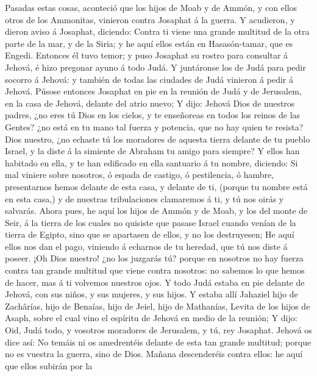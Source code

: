  Pasadas estas cosas, aconteció que los hijos de Moab y de
Ammón, y con ellos otros de los Ammonitas, vinieron contra Josaphat á la
guerra.  Y acudieron, y dieron aviso á Josaphat, diciendo:
Contra ti viene una grande multitud de la otra parte de la mar, y de la
Siria; y he aquí ellos están en Hasasón-tamar, que es Engedi.
 Entonces él tuvo temor; y puso Josaphat su rostro para
consultar á Jehová, é hizo pregonar ayuno á todo Judá.  Y
juntáronse los de Judá para pedir socorro á Jehová: y también de todas
las ciudades de Judá vinieron á pedir á Jehová.  Púsose
entonces Josaphat en pie en la reunión de Judá y de Jerusalem, en la
casa de Jehová, delante del atrio nuevo;  Y dijo: Jehová
Dios de nuestros padres, ¿no eres tú Dios en los cielos, y te enseñoreas
en todos los reinos de las Gentes? ¿no está en tu mano tal fuerza y
potencia, que no hay quien te resista?  Dios nuestro, ¿no
echaste tú los moradores de aquesta tierra delante de tu pueblo Israel,
y la diste á la simiente de Abraham tu amigo para siempre?
 Y ellos han habitado en ella, y te han edificado en ella
santuario á tu nombre, diciendo:  Si mal viniere sobre
nosotros, ó espada de castigo, ó pestilencia, ó hambre, presentarnos
hemos delante de esta casa, y delante de ti, (porque tu nombre está en
esta casa,) y de nuestras tribulaciones clamaremos á ti, y tú nos oirás
y salvarás.  Ahora pues, he aquí los hijos de Ammón y de
Moab, y los del monte de Seir, á la tierra de los cuales no quisiste que
pasase Israel cuando venían de la tierra de Egipto, sino que se
apartasen de ellos, y no los destruyesen;  He aquí ellos
nos dan el pago, viniendo á echarnos de tu heredad, que tú nos diste á
poseer.  ¡Oh Dios nuestro! ¿no los juzgarás tú? porque en
nosotros no hay fuerza contra tan grande multitud que viene contra
nosotros: no sabemos lo que hemos de hacer, mas á ti volvemos nuestros
ojos.  Y todo Judá estaba en pie delante de Jehová, con
sus niños, y sus mujeres, y sus hijos.  Y estaba allí
Jahaziel hijo de Zachârías, hijo de Benaías, hijo de Jeiel, hijo de
Mathanías, Levita de los hijos de Asaph, sobre el cual vino el espíritu
de Jehová en medio de la reunión;  Y dijo: Oid, Judá
todo, y vosotros moradores de Jerusalem, y tú, rey Josaphat. Jehová os
dice así: No temáis ni os amedrentéis delante de esta tan grande
multitud; porque no es vuestra la guerra, sino de Dios. 
Mañana descenderéis contra ellos: he aquí que ellos subirán por la
